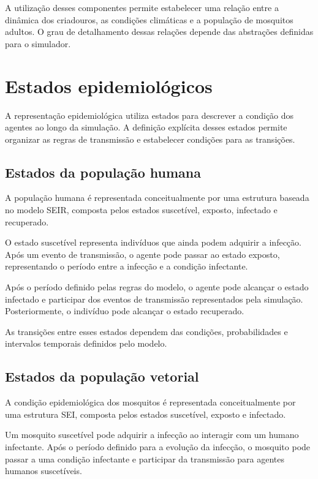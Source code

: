 A utilização desses componentes permite estabelecer uma relação entre a dinâmica dos criadouros, as condições climáticas e a população de mosquitos adultos. O grau de detalhamento dessas relações depende das abstrações definidas para o simulador.

\section{Estados epidemiológicos}

A representação epidemiológica utiliza estados para descrever a condição dos agentes ao longo da simulação. A definição explícita desses estados permite organizar as regras de transmissão e estabelecer condições para as transições.

\subsection{Estados da população humana}

A população humana é representada conceitualmente por uma estrutura baseada no modelo SEIR, composta pelos estados suscetível, exposto, infectado e recuperado.

O estado suscetível representa indivíduos que ainda podem adquirir a infecção. Após um evento de transmissão, o agente pode passar ao estado exposto, representando o período entre a infecção e a condição infectante.

Após o período definido pelas regras do modelo, o agente pode alcançar o estado infectado e participar dos eventos de transmissão representados pela simulação. Posteriormente, o indivíduo pode alcançar o estado recuperado.

As transições entre esses estados dependem das condições, probabilidades e intervalos temporais definidos pelo modelo.

\subsection{Estados da população vetorial}

A condição epidemiológica dos mosquitos é representada conceitualmente por uma estrutura SEI, composta pelos estados suscetível, exposto e infectado.

Um mosquito suscetível pode adquirir a infecção ao interagir com um humano infectante. Após o período definido para a evolução da infecção, o mosquito pode passar a uma condição infectante e participar da transmissão para agentes humanos suscetíveis.

